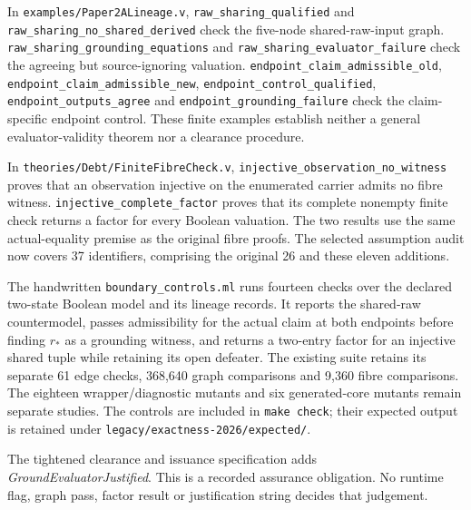 \documentclass[11pt]{article}
\theoremstyle{definition}
\newcommand{\code}[1]{\texttt{#1}}
\begin{document}
\begingroup\raggedright
In \nolinkurl{examples/Paper2ALineage.v}, \code{raw\_\allowbreak{}sharing\_\allowbreak{}qualified} and \code{raw\_\allowbreak{}sharing\_\allowbreak{}no\_\allowbreak{}shared\_\allowbreak{}derived} check the five-node shared-raw-input graph. \code{raw\_\allowbreak{}sharing\_\allowbreak{}grounding\_\allowbreak{}equations} and \code{raw\_\allowbreak{}sharing\_\allowbreak{}evaluator\_\allowbreak{}failure} check the agreeing but source-ignoring valuation. \code{endpoint\_\allowbreak{}claim\_\allowbreak{}admissible\_\allowbreak{}old}, \code{endpoint\_\allowbreak{}claim\_\allowbreak{}admissible\_\allowbreak{}new}, \code{endpoint\_\allowbreak{}control\_\allowbreak{}qualified}, \code{endpoint\_\allowbreak{}outputs\_\allowbreak{}agree} and \code{endpoint\_\allowbreak{}grounding\_\allowbreak{}failure} check the claim-specific endpoint control. These finite examples establish neither a general evaluator-validity theorem nor a clearance procedure.\par\endgroup

In \nolinkurl{theories/Debt/FiniteFibreCheck.v}, \code{injective\_\allowbreak{}observation\_\allowbreak{}no\_\allowbreak{}witness} proves that an observation injective on the enumerated carrier admits no fibre witness. \code{injective\_\allowbreak{}complete\_\allowbreak{}factor} proves that its complete nonempty finite check returns a factor for every Boolean valuation. The two results use the same actual-equality premise as the original fibre proofs. The selected assumption audit now covers 37 identifiers, comprising the original 26 and these eleven additions.

The handwritten \code{boundary\_\allowbreak{}controls.ml} runs fourteen checks over the declared two-state Boolean model and its lineage records. It reports the shared-raw countermodel, passes admissibility for the actual claim at both endpoints before finding $r_*$ as a grounding witness, and returns a two-entry factor for an injective shared tuple while retaining its open defeater. The existing suite retains its separate 61 edge checks, 368,640 graph comparisons and 9,360 fibre comparisons. The eighteen wrapper/diagnostic mutants and six generated-core mutants remain separate studies. The controls are included in \code{make check}; their expected output is retained under \nolinkurl{legacy/exactness-2026/expected/}.

The tightened clearance and issuance specification adds \emph{GroundEvaluatorJustified}. This is a recorded assurance obligation. No runtime flag, graph pass, factor result or justification string decides that judgement.
\end{document}
